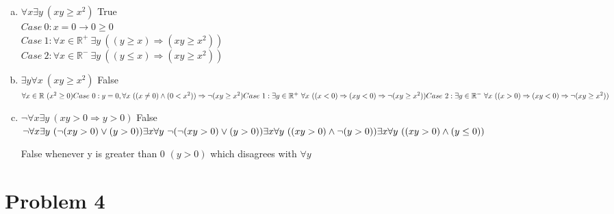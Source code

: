 \documentclass[11pt,letterpaper]{article}
\begin{document}
\begin{enumerate}[(a)]
\item $\forall x \exists y ~(xy\geq x^2)$ True\\
$Case~0: x = 0 \rightarrow 0\geq 0$\\
$Case~1: \forall x\in \mathbb{R}^{+}~\exists y
~((y\geq x)\Rightarrow (xy\geq x^2))$\\
$Case~2: \forall x\in \mathbb{R}^{-}~\exists y
~((y\leq x)\Rightarrow (xy\geq x^2))$
\item $\exists y\forall x ~(xy\geq x^2)$ False\\
$\forall x\in\mathbb{R}~(x^2\geq 0)\\
Case~0: y=0,\forall x~((x\neq0)\wedge(0 < x^2))\Rightarrow\neg(xy\geq x^2)~ \\
Case~1: \exists y\in\mathbb{R}^+~\forall x\
((x<0)\Rightarrow (xy < 0)\Rightarrow\neg(xy\geq x^2))\\
Case~2: \exists y\in\mathbb{R}^-~\forall x\
((x>0)\Rightarrow (xy <0)\Rightarrow\neg(xy\geq x^2))\\$
\item $\neg\forall x\exists y~ (xy>0\Rightarrow y>0)$ False\\
$\neg\forall x\exists y~(\neg(xy>0)\vee(y>0))\\
\exists x\forall y~ \neg(\neg(xy>0)\vee(y>0))\\
\exists x\forall y~ ((xy>0)\wedge\neg(y>0))\\
\exists x\forall y~ ((xy>0)\wedge(y\leq0))\\$
\smallskip

False whenever y is greater than 0 $(y>0)$ which disagrees with $\forall y$

\end{enumerate}
\clearpage

\section*{Problem 4}
\end{document}
